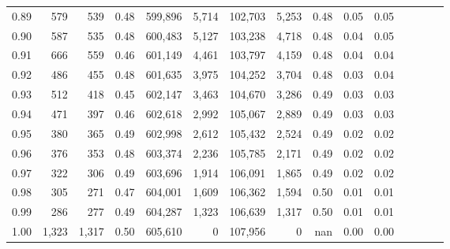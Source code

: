 \begin{tabular}{rrrcrrrrrrrrrrr}
0.89 &     579 &    539 &                                       0.48 &  599,896 &    5,714 &  102,703 &    5,253 &  0.48 &  0.05 &                         0.05 \\
0.90 &     587 &    535 &                                       0.48 &  600,483 &    5,127 &  103,238 &    4,718 &  0.48 &  0.04 &                         0.05 \\
0.91 &     666 &    559 &                                       0.46 &  601,149 &    4,461 &  103,797 &    4,159 &  0.48 &  0.04 &                         0.04 \\
0.92 &     486 &    455 &                                       0.48 &  601,635 &    3,975 &  104,252 &    3,704 &  0.48 &  0.03 &                         0.04 \\
0.93 &     512 &    418 &                                       0.45 &  602,147 &    3,463 &  104,670 &    3,286 &  0.49 &  0.03 &                         0.03 \\
0.94 &     471 &    397 &                                       0.46 &  602,618 &    2,992 &  105,067 &    2,889 &  0.49 &  0.03 &                         0.03 \\
0.95 &     380 &    365 &                                       0.49 &  602,998 &    2,612 &  105,432 &    2,524 &  0.49 &  0.02 &                         0.02 \\
0.96 &     376 &    353 &                                       0.48 &  603,374 &    2,236 &  105,785 &    2,171 &  0.49 &  0.02 &                         0.02 \\
0.97 &     322 &    306 &                                       0.49 &  603,696 &    1,914 &  106,091 &    1,865 &  0.49 &  0.02 &                         0.02 \\
0.98 &     305 &    271 &                                       0.47 &  604,001 &    1,609 &  106,362 &    1,594 &  0.50 &  0.01 &                         0.01 \\
0.99 &     286 &    277 &                                       0.49 &  604,287 &    1,323 &  106,639 &    1,317 &  0.50 &  0.01 &                         0.01 \\
1.00 &   1,323 &  1,317 &                                       0.50 &  605,610 &        0 &  107,956 &        0 &   nan &  0.00 &                         0.00 \\
\bottomrule
\end{tabular}
